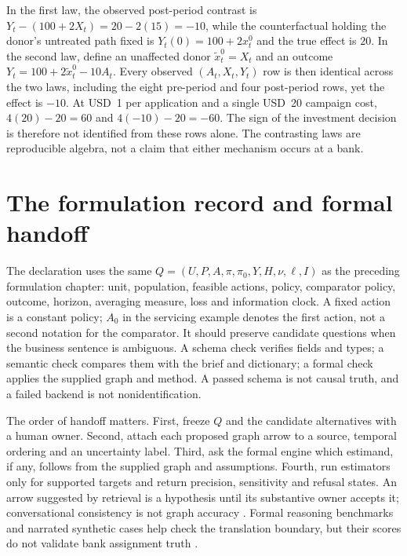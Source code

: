 In the first law, the observed post-period contrast is $Y_t-(100+2X_t)=20-2(15)=-10$, while the counterfactual holding the donor's untreated path fixed is $Y_t(0)=100+2x_t^0$ and the true effect is $20$. In the second law, define an unaffected donor $\widetilde x_t^0=X_t$ and an outcome $Y_t=100+2\widetilde x_t^0-10A_t$. Every observed $(A_t,X_t,Y_t)$ row is then identical across the two laws, including the eight pre-period and four post-period rows, yet the effect is $-10$. At USD~1 per application and a single USD~20 campaign cost, $4(20)-20=60$ and $4(-10)-20=-60$. The sign of the investment decision is therefore not identified from these rows alone. The contrasting laws are reproducible algebra, not a claim that either mechanism occurs at a bank.

\section{The formulation record and formal handoff}

The declaration uses the same $Q=(U,P,A,\pi,\pi_0,Y,H,\nu,\ell,I)$ as the preceding formulation chapter: unit, population, feasible actions, policy, comparator policy, outcome, horizon, averaging measure, loss and information clock. A fixed action is a constant policy; $A_0$ in the servicing example denotes the first action, not a second notation for the comparator. It should preserve candidate questions when the business sentence is ambiguous. A schema check verifies fields and types; a semantic check compares them with the brief and dictionary; a formal check applies the supplied graph and method. A passed schema is not causal truth, and a failed backend is not nonidentification.

The order of handoff matters. First, freeze $Q$ and the candidate alternatives with a human owner. Second, attach each proposed graph arrow to a source, temporal ordering and an uncertainty label. Third, ask the formal engine which estimand, if any, follows from the supplied graph and assumptions. Fourth, run estimators only for supported targets and return precision, sensitivity and refusal states. An arrow suggested by retrieval is a hypothesis until its substantive owner accepts it; conversational consistency is not graph accuracy \citep{v12_la_2305_00050,exec13_hallucination}. Formal reasoning benchmarks and narrated synthetic cases help check the translation boundary, but their scores do not validate bank assignment truth \citep{v12_la_2312_04350,v12_la_2607_08093}.

